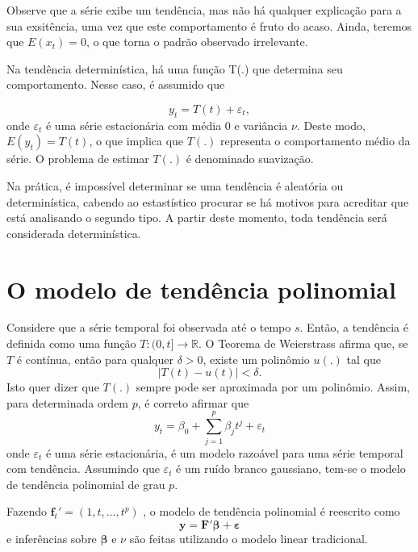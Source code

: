 \documentclass[
  letterpaper,
  DIV=11,
  numbers=noendperiod]{scrartcl}
\theoremstyle{definition}
\theoremstyle{definition}
\theoremstyle{plain}
\theoremstyle{plain}
\theoremstyle{remark}
\begin{document}
Observe que a série exibe um tendência, mas não há qualquer explicação
para a sua exsitência, uma vez que este comportamento é fruto do acaso.
Ainda, teremos que \(E(x_t)=0\), o que torna o padrão observado
irrelevante.

Na tendência determinística, há uma função T(.) que determina seu
comportamento. Nesse caso, é assumido que

\[y_t = T(t) + \varepsilon_t,\] onde \(\varepsilon_t\) é uma série
estacionária com média \(0\) e variância \(\nu\). Deste modo,
\(E(y_t)=T(t)\), o que implica que \(T(.)\) representa o comportamento
médio da série. O problema de estimar \(T(.)\) é denominado suavização.

Na prática, é impossível determinar se uma tendência é aleatória ou
determinística, cabendo ao estastístico procurar se há motivos para
acreditar que está analisando o segundo tipo. A partir deste momento,
toda tendência será considerada determinística.

\section{O modelo de tendência
polinomial}\label{o-modelo-de-tenduxeancia-polinomial}

Considere que a série temporal foi observada até o tempo \(s\). Então, a
tendência é definida como uma função \(T:(0,t]\rightarrow \mathbb{R}\).
O Teorema de Weierstrass afirma que, se \(T\) é contínua, então para
qualquer \(\delta>0\), existe um polinômio \(u(.)\) tal que
\[|T(t)-u(t)|<\delta.\] Isto quer dizer que \(T(.)\) sempre pode ser
aproximada por um polinômio. Assim, para determinada ordem \(p\), é
correto afirmar que\\
\begin{equation}
        y_t = \beta_0 + \sum_{j=1}^p \beta_j t^j + \varepsilon_t
        \end{equation} onde \(\varepsilon_t\) é uma série estacionária,
é um modelo razoável para uma série temporal com tendência. Assumindo
que \(\varepsilon_t\) é um ruído branco gaussiano, tem-se o modelo de
tendência polinomial de grau \(p\).

Fazendo \(\boldsymbol{f}_t'=(1,t,\ldots,t^p)\) , o modelo de tendência
polinomial é reescrito como
\[\boldsymbol{y}=\boldsymbol{F}'\boldsymbol{\beta}+\boldsymbol{\varepsilon}\]
e inferências sobre \(\boldsymbol{\beta}\) e \(\nu\) são feitas
utilizando o modelo linear tradicional.
\end{document}

